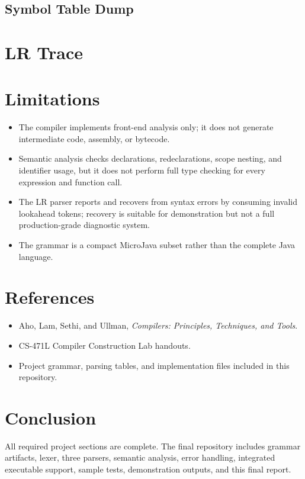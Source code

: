 \documentclass[12pt,a4paper]{article}
\begin{document}
\subsection{Symbol Table Dump}


\section{LR Trace}



\section{Limitations}

\begin{itemize}
  \item The compiler implements front-end analysis only; it does not generate intermediate code, assembly, or bytecode.
  \item Semantic analysis checks declarations, redeclarations, scope nesting, and identifier usage, but it does not perform full type checking for every expression and function call.
  \item The LR parser reports and recovers from syntax errors by consuming invalid lookahead tokens; recovery is suitable for demonstration but not a full production-grade diagnostic system.
  \item The grammar is a compact MicroJava subset rather than the complete Java language.
\end{itemize}

\section{References}

\begin{itemize}
  \item Aho, Lam, Sethi, and Ullman, \textit{Compilers: Principles, Techniques, and Tools}.
  \item CS-471L Compiler Construction Lab handouts.
  \item Project grammar, parsing tables, and implementation files included in this repository.
\end{itemize}

\section{Conclusion}

All required project sections are complete. The final repository includes grammar artifacts, lexer, three parsers, semantic analysis, error handling, integrated executable support, sample tests, demonstration outputs, and this final report.
\end{document}
